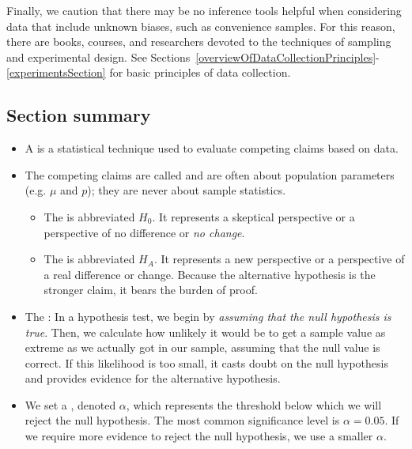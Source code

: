 Finally, we caution that there may be no inference tools helpful when considering data that include unknown biases, such as convenience samples. For this reason, there are books, courses, and researchers devoted to the techniques of sampling and experimental design. See Sections~\ref{overviewOfDataCollectionPrinciples}-\ref{experimentsSection} for basic principles of data collection.




\D{\newpage}

\subsection*{Section summary}


\begin{itemize}
\item A  is a statistical technique used to evaluate competing claims based on data.  

\item The competing claims are called  and are often about population parameters (e.g. $\mu$ and $p$); they are never about sample statistics.  \vspace{-1mm}
\begin{itemize}
\item The  is abbreviated $H_0$. It represents a skeptical perspective or a perspective of no difference or \emph{no change}.
\item The  is abbreviated $H_A$. It represents a new perspective or a perspective of a real difference or change.  Because the alternative hypothesis is the stronger claim, it bears the burden of proof.  
\end{itemize}

\item The :  In a hypothesis test, we begin by \textit{assuming that the null hypothesis is true}.  Then, we calculate how unlikely it would be to get a sample value as extreme as we actually got in our sample, assuming that the null value is correct.  If this likelihood is too small, it casts doubt on the null hypothesis and provides evidence for the alternative hypothesis.

\item We set a , denoted $\alpha$, which represents the threshold below which we will reject the null hypothesis.  The most common significance level is $\alpha = 0.05$.  If we require more evidence to reject the null hypothesis, we use a smaller $\alpha$.


\end{itemize}
